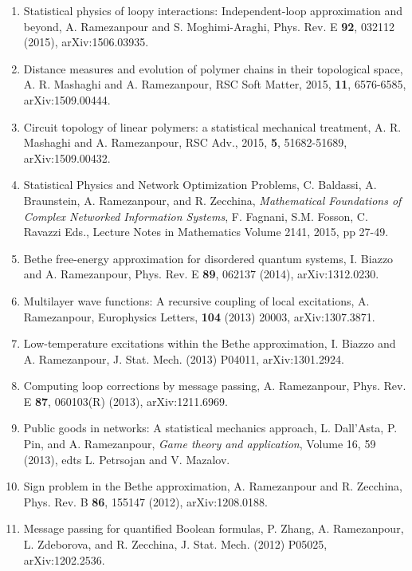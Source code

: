\documentclass[aps,preprint]{revtex4-1}
\begin{document}
\begin{enumerate}
\item  Statistical physics of loopy interactions: Independent-loop approximation and beyond, A. Ramezanpour and S. Moghimi-Araghi, Phys. Rev. E \textbf{92}, 032112 (2015), arXiv:1506.03935.

\item  Distance measures and evolution of polymer chains in their topological space, A. R. Mashaghi and A. Ramezanpour, RSC Soft Matter, 2015, \textbf{11}, 6576-6585, arXiv:1509.00444.

\item  Circuit topology of linear polymers: a statistical mechanical treatment, A. R. Mashaghi and A. Ramezanpour, RSC Adv., 2015, \textbf{5}, 51682-51689, arXiv:1509.00432.

\item Statistical Physics and Network Optimization Problems, C. Baldassi, A. Braunstein, A. Ramezanpour, and R. Zecchina, \textit{Mathematical Foundations of Complex Networked Information Systems}, F. Fagnani, S.M. Fosson, C. Ravazzi Eds., Lecture Notes in Mathematics Volume 2141, 2015, pp 27-49.

\item Bethe free-energy approximation for disordered quantum systems, I. Biazzo and A. Ramezanpour, Phys. Rev. E \textbf{89}, 062137 (2014), arXiv:1312.0230.

\item  Multilayer wave functions: A recursive coupling of local excitations, A. Ramezanpour, Europhysics Letters, \textbf{104} (2013) 20003, arXiv:1307.3871. 

\item  Low-temperature excitations within the Bethe approximation, I. Biazzo and A. Ramezanpour, J. Stat. Mech. (2013) P04011, arXiv:1301.2924. 

\item  Computing loop corrections by message passing, A. Ramezanpour, Phys. Rev. E \textbf{87}, 060103(R) (2013), arXiv:1211.6969. 

\item   Public goods in networks: A statistical mechanics approach,  L. Dall'Asta, P. Pin, and A. Ramezanpour, 
\textit{Game theory and application}, Volume 16, 59 (2013), edts L. Petrsojan and V. Mazalov.

\item  Sign problem in the Bethe approximation, A. Ramezanpour and R. Zecchina, Phys. Rev. B \textbf{86}, 155147 (2012), arXiv:1208.0188. 

\item  Message passing for quantified Boolean formulas, P. Zhang, A. Ramezanpour, L. Zdeborova, and R. Zecchina, J. Stat. Mech. (2012) P05025, arXiv:1202.2536. 


\end{enumerate}
\end{document}
